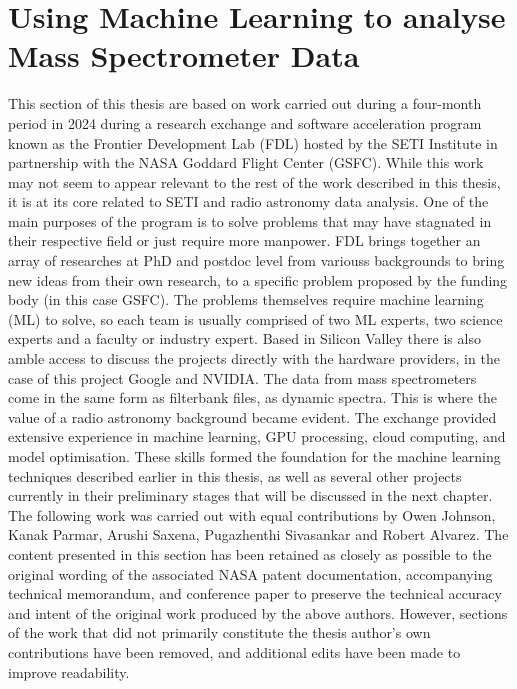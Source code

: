 
\section{Using Machine Learning to analyse Mass Spectrometer Data} \label{sec:Mars}

This section of this thesis are based on work carried out during a four-month period in 2024 during a research exchange and software acceleration program known as the Frontier Development Lab (FDL) hosted by the SETI Institute in partnership with the NASA Goddard Flight Center (GSFC). While this work may not seem to appear relevant to the rest of the work described in this thesis, it is at its core related to SETI and radio astronomy data analysis. One of the main purposes of the program is to solve problems that may have stagnated in their respective field or just require more manpower. FDL brings together an array of researches at PhD and postdoc level from variouss backgrounds to bring new ideas from their own research, to a specific problem proposed by the funding body (in this case GSFC). The problems themselves require machine learning (ML) to solve, so each team is usually comprised of two ML experts, two science experts and a faculty or industry expert. Based in Silicon Valley there is also amble access to discuss the projects directly with the hardware providers, in the case of this project Google and NVIDIA. The data from mass spectrometers come in the same form as filterbank files, as dynamic spectra. This is where the value of a radio astronomy background became evident. The exchange provided extensive experience in machine learning, GPU processing, cloud computing, and model optimisation. These skills formed the foundation for the machine learning techniques described earlier in this thesis, as well as several other projects currently in their preliminary stages that will be discussed in the next chapter.
The following work was carried out with equal contributions by Owen Johnson, Kanak Parmar, Arushi Saxena, Pugazhenthi Sivasankar and Robert Alvarez. The content presented in this section has been retained as closely as possible to the original wording of the associated NASA patent documentation, accompanying technical memorandum, and conference paper to preserve the technical accuracy and intent of the original work produced by the above authors. However, sections of the work that did not primarily constitute the thesis author's own contributions have been removed, and additional edits have been made to improve readability.


